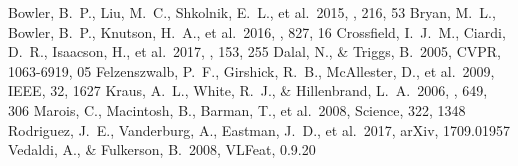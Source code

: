 \documentclass[twocolumn,longauthor]{aastex61}
\begin{document}
\begin{thebibliography}{}
 Bowler, B.~P., Liu, M.~C., Shkolnik, E.~L., et al.\ 2015, \apjs, 216, 53
 Bryan, M.~L., Bowler, B.~P., Knutson, H.~A., et al.\ 2016, \apj, 827, 16
 Crossfield, I.~J.~M., Ciardi, D.~R., Isaacson, H., et al.\ 2017, \apj, 153, 255
 Dalal, N., \& Triggs, B.\ 2005, CVPR, 1063-6919, 05
 Felzenszwalb, P.~F., Girshick, R.~B., McAllester, D., et al.\ 2009, IEEE, 32, 1627
 Kraus, A.~L., White, R.~J., \& Hillenbrand, L.~A.\ 2006, \apj, 649, 306
 Marois, C., Macintosh, B., Barman, T., et al.\ 2008, Science, 322, 1348
 Rodriguez, J.~E., Vanderburg, A., Eastman, J.~D., et al.\ 2017, arXiv, 1709.01957
 Vedaldi, A., \& Fulkerson, B.\ 2008, VLFeat, 0.9.20
\end{thebibliography}
\end{document}

